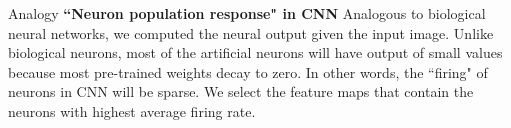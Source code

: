 \documentclass[xcolor={dvipsnames,svgnames}]{beamer}
\begin{document}
\begin{frame}[allowframebreaks]{Analogy}
\textbf{``Neuron population response" in CNN}
Analogous to biological neural networks, we computed the neural output given the input image. Unlike biological neurons, most of the artificial neurons will have output of small values because most pre-trained weights decay to zero. In other words, the ``firing" of neurons in CNN will be sparse. We select the feature maps that contain the neurons with highest average firing rate.
\end{frame}
\end{document}
